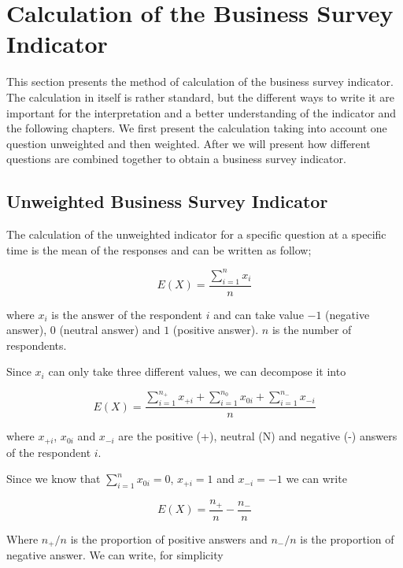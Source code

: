 \documentclass[12pt,a4paper,oneside]{book}
\begin{document}
\section{Calculation of the Business Survey Indicator}

This section presents the method of calculation of the business survey indicator.
The calculation in itself is rather standard, but the different ways to write it are important for the interpretation and a better understanding of the indicator and the following chapters.
We first present the calculation taking into account one question unweighted and then weighted. 
After we will present how different questions are combined together to obtain a business survey indicator.


\subsection{Unweighted Business Survey Indicator}

The calculation of the unweighted indicator for a specific question at a specific time is the mean of the responses and can be written as follow;

\begin{equation}
    E(X) = \frac{ \sum_{i=1}^n x_i}{n}
\end{equation} 

where 
$x_i$ is the answer of the respondent $i$ and can take value $-1$ (negative answer), $0$ (neutral answer) and $1$ (positive answer). 
$n$ is the number of respondents.

Since $x_i$ can only take three different values, we can decompose it into 

\begin{equation}
    E(X) = \frac{ \sum_{i=1}^{n_+} x_{+i} + \sum_{i=1}^{n_0} x_{0i} + \sum_{i=1}^{n_-} x_{-i}}{n}
\end{equation} 


where 
$x_{+i}$, $x_{0i}$ and $x_{-i}$ are the positive (+), neutral (N) and negative (-) answers of the respondent $i$.

Since we know that $\sum_{i=1}^n x_{0i} = 0$, $x_{+i} = 1$ and $x_{-i} = -1$ we can write

\begin{equation}
    E(X) = \frac{n_+}{n}  - \frac{n_-}{n}
\end{equation} 

Where ${n_+}/{n}$ is the proportion of positive answers and ${n_-}/{n}$ is the proportion of negative answer. We can write, for simplicity
\end{document}
